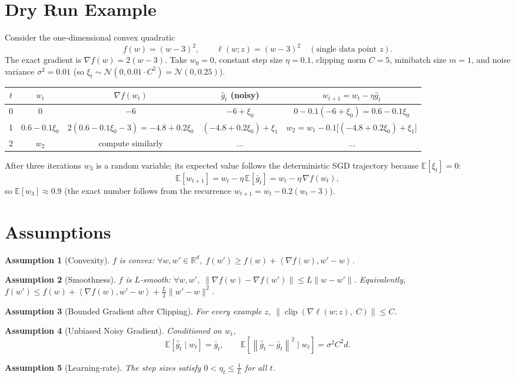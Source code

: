\documentclass[11pt]{article}
\newtheorem{assumption}{Assumption}
\newcommand{\E}{\mathbb{E}}
\newcommand{\R}{\mathbb{R}}
\newcommand{\norm}[1]{\left\|#1\right\|}
\newcommand{\inner}[2]{\left\langle #1,#2\right\rangle}
\newcommand{\clip}[2]{\operatorname{clip}\!\left(#1,\;#2\right)}
\begin{document}
\section*{Dry Run Example}
Consider the one‑dimensional convex quadratic
\[
f(w)=(w-3)^{2},\qquad \ell(w;z)= (w-3)^{2}\quad(\text{single data point }z).
\]
The exact gradient is $\nabla f(w)=2(w-3)$.  
Take $w_{0}=0$, constant step size $\eta=0.1$, clipping norm $C=5$, minibatch size $m=1$, and noise variance $\sigma^{2}=0.01$ (so $\xi_{t}\sim\mathcal{N}(0,0.01\cdot C^{2})=\mathcal{N}(0,0.25)$).

\begin{center}
\begin{tabular}{c|c|c|c|c}
$t$ & $w_{t}$ & $\nabla f(w_{t})$ & $\hat g_{t}$ (noisy) & $w_{t+1}=w_{t}-\eta\hat g_{t}$\\ \hline
0 & $0$ & $-6$ & $-6+\xi_{0}$ & $0-0.1(-6+\xi_{0})=0.6-0.1\xi_{0}$\\
1 & $0.6-0.1\xi_{0}$ & $2(0.6-0.1\xi_{0}-3)=-4.8+0.2\xi_{0}$ &
   $(-4.8+0.2\xi_{0})+\xi_{1}$ &
   $w_{2}=w_{1}-0.1\bigl[(-4.8+0.2\xi_{0})+\xi_{1}\bigr]$\\
2 & $w_{2}$ & compute similarly & $\dots$ & $\dots$
\end{tabular}
\end{center}
After three iterations $w_{3}$ is a random variable; its expected value follows the deterministic SGD trajectory because $\E[\xi_{t}]=0$:
\[
\E[w_{t+1}] = w_{t} -\eta\,\E[\bar g_{t}] = w_{t} -\eta\,\nabla f(w_{t}),
\]
so $\E[w_{3}]\approx 0.9$ (the exact number follows from the recurrence $w_{t+1}=w_{t}-0.2(w_{t}-3)$).

\section*{Assumptions}
\begin{assumption}[Convexity]\label{ass:convex}
$f$ is convex: $\forall w,w'\in\R^{d},\; f(w')\ge f(w)+\inner{\nabla f(w)}{w'-w}$.
\end{assumption}
\begin{assumption}[Smoothness]\label{ass:smooth}
$f$ is $L$‑smooth: $\forall w,w',\;
\|\nabla f(w)-\nabla f(w')\|\le L\|w-w'\|$.
Equivalently,
$f(w')\le f(w)+\inner{\nabla f(w)}{w'-w}+ \frac{L}{2}\|w'-w\|^{2}$.
\end{assumption}
\begin{assumption}[Bounded Gradient after Clipping]\label{ass:clip}
For every example $z$, $\norm{\clip{\nabla\ell(w;z)}{C}}\le C$.
\end{assumption}
\begin{assumption}[Unbiased Noisy Gradient]\label{ass:unbiased}
Conditioned on $w_{t}$,
\[
\E[\hat g_{t}\mid w_{t}]=\bar g_{t},\qquad 
\E[\norm{\hat g_{t}-\bar g_{t}}^{2}\mid w_{t}]=\sigma^{2}C^{2}d.
\]
\end{assumption}
\begin{assumption}[Learning‑rate]\label{ass:lr}
The step sizes satisfy $0<\eta_{t}\le \frac{1}{L}$ for all $t$.
\end{assumption}
\end{document}
